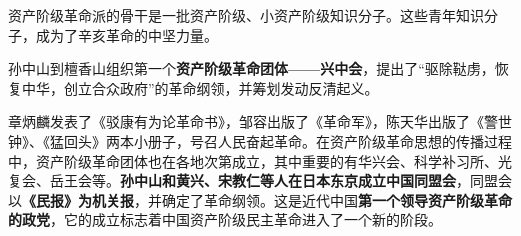 {资产阶级革命派的骨干是一批{资产阶级、小资产阶级知识分子}。这些青年知识分子，成为了辛亥革命的中坚力量。}

{孙中山到檀香山组织第一个\textbf{{资产阶级革命团体}{------}{兴中会}}，提出了``{驱除鞑虏，恢复中华，创立合众政府}''的革命纲领，并筹划发动反清起义。}

{{章炳麟发表了《驳康有为论革命书》，邹容出版了《革命军》，陈天华出版了《警世钟》、《猛回头》两本小册子}{，号召人民奋起革命。在资产阶级革命思想的传播过程中，资产阶级革命团体也在各地次第成立，其中重要的有}{华兴会、科学补习所、光复会、岳王会}{等。}\textbf{{孙中山和黄兴、宋教仁等人在日本东京成立中国同盟会}}{，同盟会以}\textbf{{《民报》为机关报}}{，并确定了革命纲领。这是近代中国}\textbf{{第一个领导资产阶级革命的政党}}{，它的成立标志着中国资产阶级民主革命进入了一个新的阶段。}}
